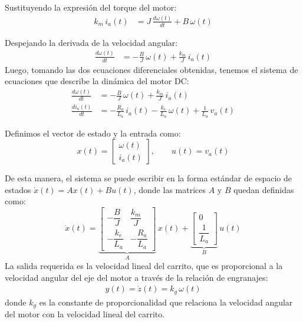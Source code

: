 \documentclass[
  11pt,
  letterpaper,
   addpoints,
  answers
  ]{exam}
\begin{document}
\begin{solution}
Sustituyendo la expresión del torque del motor:
\begin{align}
k_m\,i_a(t) &= J\,\frac{d\omega(t)}{dt} + B\,\omega(t)
\end{align}

Despejando la derivada de la velocidad angular:
\begin{align}
\frac{d\omega(t)}{dt} &= -\frac{B}{J}\,\omega(t) + \frac{k_m}{J}\,i_a(t)
\end{align}
Luego, tomando las dos ecuaciones diferenciales obtenidas, tenemos el sistema de ecuaciones que describe la dinámica del motor DC:
\begin{align}
 \frac{d\omega(t)}{dt} &= -\frac{B}{J}\,\omega(t) + \frac{k_m}{J}\,i_a(t) \\
  \frac{di_a(t)}{dt} &= -\frac{R_a}{L_a}\,i_a(t) - \frac{k_e}{L_a}\,\omega(t) + \frac{1}{L_a}\,v_a(t)
\end{align}

Definimos el vector de estado y la entrada como:
\begin{equation}
  x(t) = \begin{bmatrix}\omega(t)\\ i_a(t)\end{bmatrix}, \qquad
  u(t) = v_a(t)
\end{equation}

De esta manera, el sistema se puede escribir en la forma estándar de espacio de estados $\dot{x}(t) = Ax(t) + Bu(t)$, donde las matrices $A$ y $B$ quedan definidas como:
\begin{equation}
  \dot{x}(t) = 
  \underbrace{\begin{bmatrix}
    -\dfrac{B}{J} & \dfrac{k_m}{J}\\[6pt]
    -\dfrac{k_e}{L_a} & -\dfrac{R_a}{L_a}
  \end{bmatrix}}_{A}\,x(t)
  +
  \underbrace{\begin{bmatrix}
    0\\[2pt]\dfrac{1}{L_a}
  \end{bmatrix}}_{B}\,u(t)
\end{equation}
La salida requerida es la velocidad lineal del carrito, que es proporcional a la velocidad angular del eje del motor a través de la relación de engranajes:
\begin{align}
  y(t) = \dot{z}(t) = k_g\,\omega(t)
\end{align}
donde $k_g$ es la constante de proporcionalidad que relaciona la velocidad angular del motor con la velocidad lineal del carrito.


\end{solution}
\end{document}
